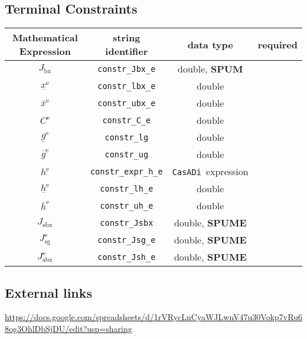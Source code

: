 \documentclass{article}
\newcommand{\code}[1]{\texttt{#1}}
\newcommand{\casadi}{\texttt{CasADi}}
\newcommand{\ind}[1]{_{\textrm{#1}}}
\newcommand{\terminal}{^{\textrm{e}}}
\begin{document}
\newpage
\subsection{Terminal Constraints}
\begin{table}[h]
	\centering
	\begin{tabular}{|c|c|c|c|}
		\toprule
		Mathematical Expression & string identifier & data type  & required \\ \midrule
		$J_{\textrm{bx}}$ & \code{constr\_Jbx\_e}    & double, \textbf{SPUM}   & \optional   \\
		$\underline{x}\terminal $    & \code{constr\_lbx\_e}     & double  & \optional   \\
		$\bar{x}\terminal $         & \code{constr\_ubx\_e}     & double   & \optional  \\ \midrule
		$ C\terminal $ & \code{constr\_C\_e}    & double   & \optional   \\
		$\underline{g}\terminal $    & \code{constr\_lg}     & double   & \optional   \\
		$\bar{g}\terminal $         & \code{constr\_ug}     & double   & \optional  \\ \midrule
		$ h\terminal $ & \code{constr\_expr\_h\_e}    & \casadi~expression   & \optional  \\
		$\underline{h}\terminal $    & \code{constr\_lh\_e}     & double   & \optional   \\
		$\bar{h}\terminal $         & \code{constr\_uh\_e}     & double  & \optional   \\ \midrule
		$ J\ind{sbx} $ & \code{constr\_Jsbx} & double, \textbf{SPUME}   & \optional \\
		$ J\ind{sg}\terminal $ & \code{constr\_Jsg\_e} & double, \textbf{SPUME} & \optional  \\
		$ J\ind{sbx}\terminal $ & \code{constr\_Jsh\_e} & double, \textbf{SPUME}  & \optional  \\
		\bottomrule
	\end{tabular}
\end{table}

\subsection{External links}
\url{https://docs.google.com/spreadsheets/d/1rVRycLnCyaWJLwnV47u30Vokp7vRu68og3OhlDbSjDU/edit?usp=sharing}
\end{document}
